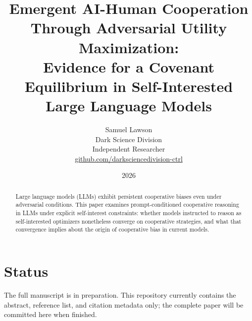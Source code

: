 \documentclass[11pt,a4paper]{article}
\title{Emergent AI-Human Cooperation Through Adversarial Utility Maximization: \\
Evidence for a Covenant Equilibrium in Self-Interested Large Language Models}
\author{Samuel Lawson \\
Dark Science Division \\
Independent Researcher \\
\href{https://github.com/darksciencedivision-ctrl}{github.com/darksciencedivision-ctrl}}
\date{2026}
\begin{document}
\maketitle

\begin{abstract}
Large language models (LLMs) exhibit persistent cooperative biases even under adversarial conditions. This paper examines prompt-conditioned cooperative reasoning in LLMs under explicit self-interest constraints: whether models instructed to reason as self-interested optimizers nonetheless converge on cooperative strategies, and what that convergence implies about the origin of cooperative bias in current models.
\end{abstract}

\section*{Status}

The full manuscript is in preparation. This repository currently contains the abstract, reference list, and citation metadata only; the complete paper will be committed here when finished.



\end{document}
